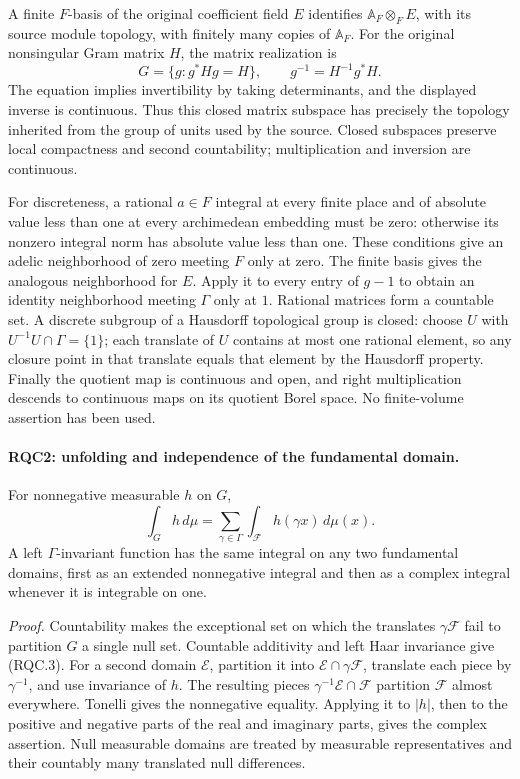 A finite \(F\)-basis of the original coefficient field \(E\)
identifies \(\mathbb A_F\otimes_F E\), with its source module
topology, with finitely many copies of \(\mathbb A_F\).  For the
original nonsingular Gram matrix \(H\), the matrix realization is
\[
 G=\{g:g^*Hg=H\},\qquad g^{-1}=H^{-1}g^*H.
 \tag{RQC.2}
\]
The equation implies invertibility by taking determinants, and the
displayed inverse is continuous.  Thus this closed matrix subspace
has precisely the topology inherited from the group of units used
by the source.  Closed subspaces preserve local compactness and
second countability; multiplication and inversion are continuous.

For discreteness, a rational \(a\in F\) integral at every finite
place and of absolute value less than one at every archimedean
embedding must be zero: otherwise its nonzero integral norm has
absolute value less than one.  These conditions give an adelic
neighborhood of zero meeting \(F\) only at zero.  The finite basis
gives the analogous neighborhood for \(E\).  Apply it to every
entry of \(g-1\) to obtain an identity neighborhood meeting
\(\Gamma\) only at \(1\).  Rational matrices form a countable set.
A discrete subgroup of a Hausdorff topological group is closed:
choose \(U\) with \(U^{-1}U\cap\Gamma=\{1\}\); each translate of
\(U\) contains at most one rational element, so any closure point
in that translate equals that element by the Hausdorff property.
Finally the quotient map is continuous and open, and right
multiplication descends to continuous maps on its quotient Borel
space.  No finite-volume assertion has been used.

\paragraph{RQC2: unfolding and independence of the fundamental domain.}
\label{claim:RQC2}
For nonnegative measurable \(h\) on \(G\),
\[
 \int_G h\,d\mu
 =\sum_{\gamma\in\Gamma}\int_{\mathcal F}h(\gamma x)\,d\mu(x).
 \tag{RQC.3}
\]
A left \(\Gamma\)-invariant function has the same integral on any
two fundamental domains, first as an extended nonnegative integral
and then as a complex integral whenever it is integrable on one.

\emph{Proof.}
Countability makes the exceptional set on which the translates
\(\gamma\mathcal F\) fail to partition \(G\) a single null set.
Countable additivity and left Haar invariance give (RQC.3).
For a second domain \(\mathcal E\), partition it into
\(\mathcal E\cap\gamma\mathcal F\), translate each piece by
\(\gamma^{-1}\), and use invariance of \(h\).
The resulting pieces \(\gamma^{-1}\mathcal E\cap\mathcal F\)
partition \(\mathcal F\) almost everywhere.  Tonelli gives the
nonnegative equality.  Applying it to \(|h|\), then to the positive
and negative parts of the real and imaginary parts, gives the
complex assertion.  Null measurable domains are treated by
measurable representatives and their countably many translated null
differences.

